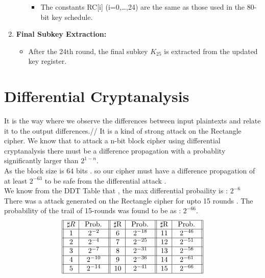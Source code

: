 \documentclass[journal=tosc,preprint]{iacrtrans}
\begin{document}
\begin{enumerate}
\begin{enumerate}
\begin{itemize}
        \item The constants RC[i] (i=0,…,24) are the same as those used in the 80-bit key schedule.
        \end{itemize}
        
    \end{enumerate}
    
    \item \textbf{Final Subkey Extraction:}
    \begin{itemize}
        \item After the 24th round, the final subkey \(K_{25}\) is extracted from the updated key register.
        
    \end{itemize}
\end{enumerate}

\section{Differential Cryptanalysis}
It is the way where we observe the differences between input plaintexts and relate it to the output differences.// 
It is a kind of strong attack on the Rectangle cipher.
We know that to attack a n-bit block cipher using differential cryptanalysis there must be a difference propagation with a probablity significantly larger than $2^{1-n}$.\\
As the block size is 64 bits . so our cipher must have a difference propagation of at least $2^{-63}$ to be safe from the differential attack .\\
We know from the DDT Table that , the max differential probaility is : $2^{-6}$\\
There was a attack generated on the Rectangle cipher for upto 15 rounds . The probability of the trail of 15-rounds was found to be as : $2^{-66}$.\\
$$\begin{array}{||c|c||c|c||c|c||}
\hline \sharp R & \text { Prob. } & \sharp \mathrm{R} & \text { Prob. } & \sharp \mathrm{R} & \text { Prob. } \\
\hline 1 & 2^{-2} & 6 & 2^{-18} & 11 & 2^{-46} \\
\hline 2 & 2^{-4} & 7 & 2^{-25} & 12 & 2^{-51} \\
\hline 3 & 2^{-7} & 8 & 2^{-31} & 13 & 2^{-56} \\
\hline 4 & 2^{-10} & 9 & 2^{-36} & 14 & 2^{-61} \\
\hline 5 & 2^{-14} & 10 & 2^{-41} & 15 & 2^{-66} \\
\hline
\end{array}$$
\end{document}
